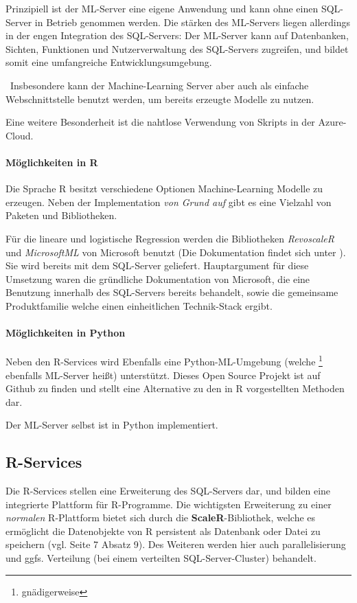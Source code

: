 Prinzipiell ist der ML-Server eine eigene Anwendung und kann ohne einen SQL-Server in Betrieb genommen werden. Die stärken des ML-Servers liegen allerdings in der engen Integration des SQL-Servers: Der ML-Server kann auf Datenbanken, Sichten, Funktionen und Nutzerverwaltung des SQL-Servers zugreifen, und bildet somit eine umfangreiche Entwicklungsumgebung.

~\newline Insbesondere kann der Machine-Learning Server aber auch als einfache Webschnittstelle benutzt werden, um bereits erzeugte Modelle zu nutzen.

Eine weitere Besonderheit ist die nahtlose Verwendung von Skripts in der Azure-Cloud. 
\paragraph{Möglichkeiten in  R}
Die Sprache R besitzt verschiedene Optionen Machine-Learning Modelle zu erzeugen. Neben der Implementation \textit{von Grund auf} gibt es eine Vielzahl von Paketen und Bibliotheken. 

Für die lineare und logistische Regression werden die Bibliotheken \textit{RevoscaleR} und \textit{MicrosoftML} von Microsoft benutzt (Die Dokumentation findet sich unter \cite{RevoscaleR}). Sie wird bereits mit dem SQL-Server geliefert. Hauptargument für diese Umsetzung waren die gründliche Dokumentation von Microsoft, die eine Benutzung innerhalb des SQL-Servers bereits behandelt, sowie die gemeinsame Produktfamilie welche einen einheitlichen Technik-Stack ergibt. 
\paragraph{Möglichkeiten in Python}
Neben den R-Services wird Ebenfalls eine Python-ML-Umgebung (welche \footnote{gnädigerweise} ebenfalls ML-Server heißt) unterstützt. Dieses Open Source Projekt ist auf Github \cite{GithubMLServer} zu finden und stellt eine Alternative zu den in R vorgestellten Methoden dar. 

Der ML-Server selbst ist in Python implementiert.

\subsection{R-Services}
Die R-Services stellen eine Erweiterung des SQL-Servers dar, und bilden eine integrierte Plattform für R-Programme. Die wichtigsten Erweiterung zu einer \textit{normalen} R-Plattform bietet sich durch die \textbf{ScaleR}-Bibliothek, welche es ermöglicht die Datenobjekte von R persistent als Datenbank oder Datei zu speichern (vgl. \cite{SQLData} Seite 7 Absatz 9). Des Weiteren werden hier auch parallelisierung und ggfs. Verteilung (bei einem verteilten SQL-Server-Cluster) behandelt.

